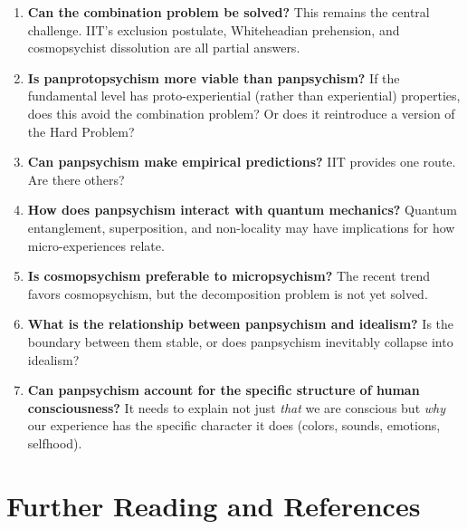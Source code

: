 \documentclass[11pt,a4paper]{report}
\begin{document}
\begin{enumerate}[leftmargin=2em]
  \item \textbf{Can the combination problem be solved?} This remains the central challenge. IIT's exclusion postulate, Whiteheadian prehension, and cosmopsychist dissolution are all partial answers.
  \item \textbf{Is panprotopsychism more viable than panpsychism?} If the fundamental level has proto-experiential (rather than experiential) properties, does this avoid the combination problem? Or does it reintroduce a version of the Hard Problem?
  \item \textbf{Can panpsychism make empirical predictions?} IIT provides one route. Are there others?
  \item \textbf{How does panpsychism interact with quantum mechanics?} Quantum entanglement, superposition, and non-locality may have implications for how micro-experiences relate.
  \item \textbf{Is cosmopsychism preferable to micropsychism?} The recent trend favors cosmopsychism, but the decomposition problem is not yet solved.
  \item \textbf{What is the relationship between panpsychism and idealism?} Is the boundary between them stable, or does panpsychism inevitably collapse into idealism?
  \item \textbf{Can panpsychism account for the specific structure of human consciousness?} It needs to explain not just \emph{that} we are conscious but \emph{why} our experience has the specific character it does (colors, sounds, emotions, selfhood).
\end{enumerate}


\chapter{Further Reading and References}
\end{document}
